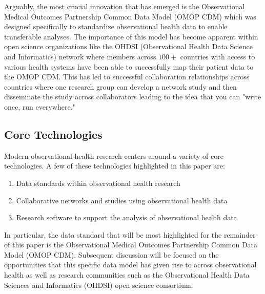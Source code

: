 \documentclass{juliacon}
\begin{document}
Arguably, the most crucial innovation that has emerged is the Observational Medical Outcomes Partnership Common Data Model (OMOP CDM) which was designed specifically to standardize observational health data to enable transferable analyses. \cite{overhage2012validation}
The importance of this model has become apparent within open science organizations like the OHDSI (Observational Health Data Science and Informatics) network where members across $100+$ countries \cite{sachsonOurJourney2023} with access to various health systems have been able to successfully map their patient data to the OMOP CDM.
This has led to successful collaboration relationships across countries where one research group can develop a network study and then disseminate the study across collaborators leading to the idea that you can "write once, run everywhere."

\subsection{Core Technologies}

Modern observational health research centers around a variety of core technologies.
A few of these technologies highlighted in this paper are:

\begin{enumerate}

\item Data standards within observational health research
\item Collaborative networks and studies using observational health data
\item Research software to support the analysis of observational health data

\end{enumerate}

In particular, the data standard that will be most highlighted for the remainder of this paper is the Observational Medical Outcomes Partnership Common Data Model (OMOP CDM).
Subsequent discussion will be focused on the opportunities that this specific data model has given rise to across observational health as well as research communities such as the Observational Health Data Sciences and Informatics (OHDSI) open science consortium.
\end{document}
